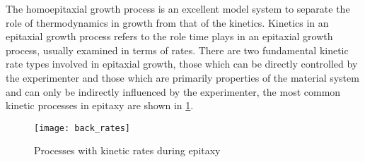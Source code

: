 The homoepitaxial growth process is an excellent model system to separate the role of thermodynamics in growth from that of the kinetics. Kinetics in an epitaxial growth process refers to the role time plays in an epitaxial growth process, usually examined in terms of rates. There are two fundamental kinetic rate types involved in epitaxial growth, those which can be directly controlled by the experimenter and those which are primarily properties of the material system and can only be indirectly influenced by the experimenter, the most common kinetic processes in epitaxy are shown in \cref{fig:back_epi_rates}.
\begin{figure}
    \centering
    \texttt{[image: back\_rates]}
    \caption{\label{fig:back_epi_rates}Processes with kinetic rates during epitaxy}
\end{figure}

